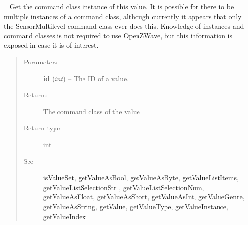 \documentclass[letterpaper,10pt,english]{sphinxmanual}
\begin{document}
\begin{fulllineitems}
\begin{fulllineitems}
\begin{quote}
\begin{description}
\end{description}\end{quote}

\end{fulllineitems}


\begin{fulllineitems}
\label{libopenzwave:libopenzwave.PyManager.getValueCommandClass}~\label{libopenzwave:getvaluecommandclass}
Get the command class instance of this value.  It is possible for there to be
multiple instances of a command class, although currently it appears that
only the SensorMultilevel command class ever does this.  Knowledge of
instances and command classes is not required to use OpenZWave, but this
information is exposed in case it is of interest.
\begin{quote}\begin{description}
\item[{Parameters}] \leavevmode
\textbf{id} (\emph{int}) -- The ID of a value.

\item[{Returns}] \leavevmode
The command class of the value

\item[{Return type}] \leavevmode
int

\item[{See}] \leavevmode
{\hyperref[libopenzwave:isvalueset]{isValueSet}}, {\hyperref[libopenzwave:getvalueasbool]{getValueAsBool}}, {\hyperref[libopenzwave:getvalueasbyte]{getValueAsByte}}, {\hyperref[libopenzwave:getvaluelistitems]{getValueListItems}}, {\hyperref[libopenzwave:getvaluelistselectionstr]{getValueListSelectionStr}} , {\hyperref[libopenzwave:getvaluelistselectionnum]{getValueListSelectionNum}}, {\hyperref[libopenzwave:getvalueasfloat]{getValueAsFloat}}, {\hyperref[libopenzwave:getvalueasshort]{getValueAsShort}}, {\hyperref[libopenzwave:getvalueasint]{getValueAsInt}}, {\hyperref[libopenzwave:getvaluegenre]{getValueGenre}}, {\hyperref[libopenzwave:getvalueasstring]{getValueAsString}}, {\hyperref[libopenzwave:getvalue]{getValue}}, {\hyperref[libopenzwave:getvaluetype]{getValueType}}, {\hyperref[libopenzwave:getvalueinstance]{getValueInstance}}, {\hyperref[libopenzwave:getvalueindex]{getValueIndex}}

\end{description}\end{quote}


\end{fulllineitems}
\end{fulllineitems}
\end{document}
